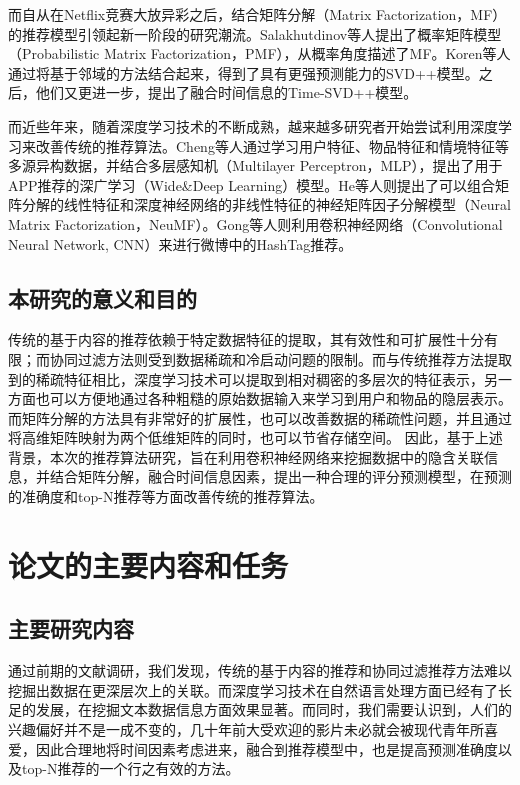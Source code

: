 而自从在Netflix竞赛大放异彩之后，结合矩阵分解（Matrix Factorization，MF）的推荐模型引领起新一阶段的研究潮流。Salakhutdinov等人\cite{SalakhutdinovM07PMF}提出了概率矩阵模型（Probabilistic Matrix Factorization，PMF），从概率角度描述了MF。Koren等人\cite{Koren08SVD++}通过将基于邻域的方法结合起来，得到了具有更强预测能力的SVD++模型。之后，他们又更进一步，提出了融合时间信息的Time-SVD++模型\cite{Koren09TimeSVD}。

而近些年来，随着深度学习技术的不断成熟，越来越多研究者开始尝试利用深度学习来改善传统的推荐算法。Cheng等人通过学习用户特征、物品特征和情境特征等多源异构数据，并结合多层感知机（Multilayer Perceptron，MLP），提出了用于APP推荐的深广学习（Wide\&Deep Learning）模型。He等人\cite{HeLZNHC17NCF}则提出了可以组合矩阵分解的线性特征和深度神经网络的非线性特征的神经矩阵因子分解模型（Neural Matrix Factorization，NeuMF）。Gong等人\cite{GongZ16HashtagAttention}则利用卷积神经网络（Convolutional Neural Network, CNN）来进行微博中的HashTag推荐。
\section{本研究的意义和目的} 
传统的基于内容的推荐依赖于特定数据特征的提取，其有效性和可扩展性十分有限；而协同过滤方法则受到数据稀疏和冷启动问题的限制。而与传统推荐方法提取到的稀疏特征相比，深度学习技术可以提取到相对稠密的多层次的特征表示\cite{ChengKHSCAACCIA16Wide&Deep}，另一方面也可以方便地通过各种粗糙的原始数据输入来学习到用户和物品的隐层表示。而矩阵分解的方法具有非常好的扩展性，也可以改善数据的稀疏性问题，并且通过将高维矩阵映射为两个低维矩阵的同时，也可以节省存储空间。
因此，基于上述背景，本次的推荐算法研究，旨在利用卷积神经网络来挖掘数据中的隐含关联信息，并结合矩阵分解，融合时间信息因素，提出一种合理的评分预测模型，在预测的准确度和top-N推荐等方面改善传统的推荐算法。
\chapter{论文的主要内容和任务}
\section{主要研究内容}
通过前期的文献调研，我们发现，传统的基于内容的推荐和协同过滤推荐方法难以挖掘出数据在更深层次上的关联。而深度学习技术在自然语言处理方面已经有了长足的发展，在挖掘文本数据信息方面效果显著。而同时，我们需要认识到，人们的兴趣偏好并不是一成不变的，几十年前大受欢迎的影片未必就会被现代青年所喜爱，因此合理地将时间因素考虑进来，融合到推荐模型中，也是提高预测准确度以及top-N推荐的一个行之有效的方法。



